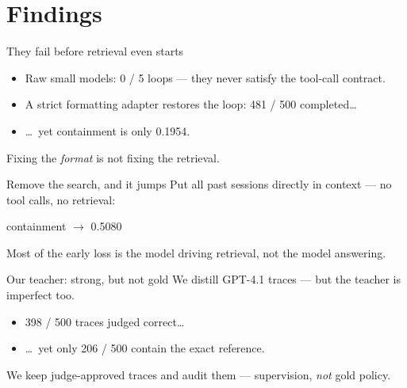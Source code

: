 \documentclass[10pt,aspectratio=169]{beamer}
\begin{document}
\section{Findings}

\begin{frame}{They fail before retrieval even starts}
  \begin{itemize}
    \item Raw small models: \alert{0 / 5} loops --- they never satisfy the tool-call contract.
    \item A strict formatting adapter restores the loop: \alert{481 / 500} completed\dots
    \item \dots\ yet containment is only \alert{0.1954}.
  \end{itemize}
  \vspace{1.0em}
  \begin{center}
    \large Fixing the \emph{format} is not fixing the \alert{retrieval}.
  \end{center}
\end{frame}

\begin{frame}{Remove the search, and it jumps}
  Put \alert{all past sessions directly in context} --- no tool calls, no retrieval:
  \vspace{0.9em}
  \begin{center}
    {\large containment \;\;$\longrightarrow$\;\; \alert{\large 0.5080}}
  \end{center}
  \vspace{0.9em}
  Most of the early loss is the model \alert{driving retrieval}, not the model
  answering.
\end{frame}

\begin{frame}{Our teacher: strong, but not gold}
  We distill GPT-4.1 traces --- but the teacher is imperfect too.
  \vspace{0.8em}
  \begin{itemize}
    \item \alert{398 / 500} traces judged correct\dots
    \item \dots\ yet only \alert{206 / 500} contain the exact reference.
  \end{itemize}
  \vspace{0.6em}
  We keep \alert{judge-approved} traces and audit them --- supervision,
  \emph{not} gold policy.
\end{frame}
\end{document}
